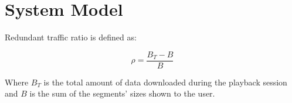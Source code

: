 
\section{System Model}

\label{sec:sysmodel}

Redundant traffic ratio is defined as:

\begin{equation}
	\rho = \frac{B_T-B}{B}
\end{equation}

Where $B_T$ is the total amount of data downloaded during the playback session and $B$ is the sum of the segments' sizes shown to the user.



